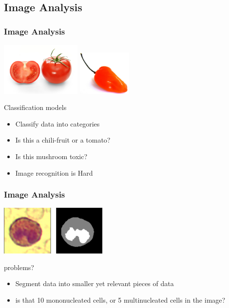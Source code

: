 \documentclass[aspectratio=169,usenames,dvipsnames]{beamer}
\begin{document}
\subsection{Image Analysis}
\begin{frame}
    \frametitle{Image Analysis}
    \centering
    \includegraphics[width=0.3\textwidth]{Figures/small_tomato.jpg}
    \includegraphics[width=0.2\textwidth]{Figures/chili.jpg}
    \begin{block}{Classification models}
        \begin{itemize}
            \item Classify data into categories
            \item Is this a chili-fruit or a tomato?
            \item Is this mushroom toxic?
            \item Image recognition is Hard
        \end{itemize}
    \end{block}
\end{frame}
\begin{frame}
    \frametitle{Image Analysis}
    \centering
    \includegraphics[width=0.4\textwidth]{Figures/eosinophile.png}
    \vspace{-0.9\baselineskip}
    \begin{block}{problems?}
        \begin{itemize}
            \item Segment data into smaller yet relevant pieces of data
            \item is that 10 mononucleated cells, or 5 multinucleated cells in the image?
        \end{itemize}
    \end{block}
\end{frame}
\end{document}
